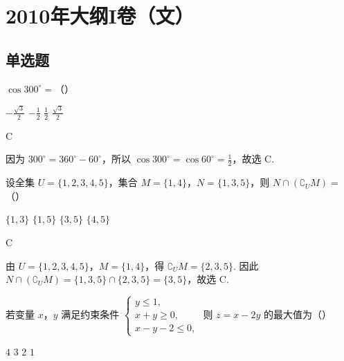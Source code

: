 \chapter{2010年大纲I卷（文）}

\section{单选题}

\begin{problem}
\(\cos 300^{\circ} =\)（\quad）

\choices
    {\(-\frac{\sqrt{3}}{2}\)}
    {\(-\frac{1}{2}\)}
    {\( \frac{1}{2} \)}
    {\(\frac{\sqrt{3}}{2}\)}
\end{problem}

\begin{answer}
C
\end{answer}

\begin{solution}
因为 \(300^{\circ}=360^{\circ}-60^{\circ}\)，所以 \(\cos 300^{\circ}=\cos 60^{\circ}=\frac{1}{2}\)，故选 C.
\end{solution}

\begin{problem}
设全集 \(U = \{1, 2, 3, 4, 5\}\)，集合 \(M = \{1, 4\}\)，\(N = \{1, 3, 5\}\)，则 \(N \cap (\complement_U M) =\)（\quad）

\choices
    {\(\{1,3\}\)}
    {\(\{1, 5\}\)}
    {\(\{3, 5\}\)}
    {\(\{4, 5\}\)}
\end{problem}

\begin{answer}
C
\end{answer}

\begin{solution}
由 \(U=\{1,2,3,4,5\}\)，\(M=\{1,4\}\)，得 \(\complement_U M=\{2,3,5\}\). 因此
\(N\cap(\complement_U M)=\{1,3,5\}\cap\{2,3,5\}=\{3,5\}\)，故选 C.
\end{solution}

\begin{problem}
若变量 \(x\)，\(y\) 满足约束条件 \(\begin{cases}
y \leqslant 1,\\
x + y \geqslant 0,\\
x - y - 2 \leqslant 0,
\end{cases}\) 则 \(z = x - 2y\) 的最大值为（\quad）

\choices
    {\(4\)}
    {\(3\)}
    {\(2\)}
    {\(1\)}
\end{problem}

